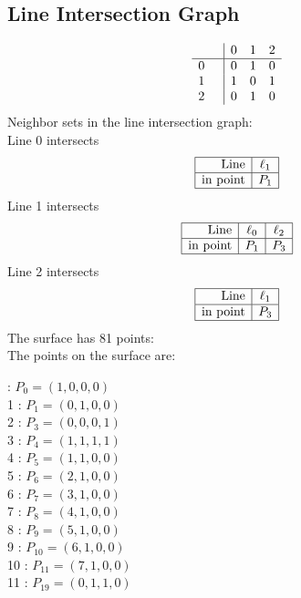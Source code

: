 \documentclass{article}
\begin{document}
{\subsection*{Line Intersection Graph}
{\arraycolsep=1pt
$$
\begin{array}{rr|*{3}r}
 &  & 0 & 1 & 2\\
\hline
0 &  & 0 & 1 & 0\\
1 &  & 1 & 0 & 1\\
2 &  & 0 & 1 & 0\\
\end{array}
$$
}%
Neighbor sets in the line intersection graph:\\
Line 0 intersects 
$$
\begin{array}{|r*{1}{|c}|}
\hline
\mbox{Line}  & \ell_{1}\\
\hline
\mbox{in point}  & P_{1}\\
\hline
\end{array}
$$
Line 1 intersects 
$$
\begin{array}{|r*{2}{|c}|}
\hline
\mbox{Line}  & \ell_{0} & \ell_{2}\\
\hline
\mbox{in point}  & P_{1} & P_{3}\\
\hline
\end{array}
$$
Line 2 intersects 
$$
\begin{array}{|r*{1}{|c}|}
\hline
\mbox{Line}  & \ell_{1}\\
\hline
\mbox{in point}  & P_{3}\\
\hline
\end{array}
$$
The surface has 81 points:\\
The points on the surface are:\\
\begin{multicols}{3}
 : $P_{0}=( 1, 0, 0, 0 )$\\
1 : $P_{1}=( 0, 1, 0, 0 )$\\
2 : $P_{3}=( 0, 0, 0, 1 )$\\
3 : $P_{4}=( 1, 1, 1, 1 )$\\
4 : $P_{5}=( 1, 1, 0, 0 )$\\
5 : $P_{6}=( 2, 1, 0, 0 )$\\
6 : $P_{7}=( 3, 1, 0, 0 )$\\
7 : $P_{8}=( 4, 1, 0, 0 )$\\
8 : $P_{9}=( 5, 1, 0, 0 )$\\
9 : $P_{10}=( 6, 1, 0, 0 )$\\
10 : $P_{11}=( 7, 1, 0, 0 )$\\
11 : $P_{19}=( 0, 1, 1, 0 )$\\

\end{multicols}}
\end{document}
